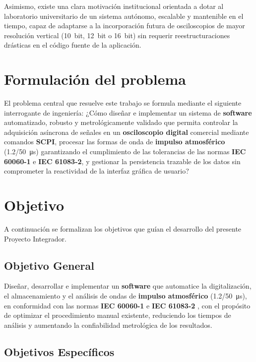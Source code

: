 Asimismo, existe una clara motivación institucional orientada a dotar al laboratorio universitario de un sistema autónomo, escalable y mantenible en el tiempo, capaz de adaptarse a la incorporación futura de osciloscopios de mayor resolución vertical (\qty{10}{bit}, \qty{12}{bit} o \qty{16}{bit}) sin requerir reestructuraciones drásticas en el código fuente de la aplicación.

\section{Formulación del problema} \label{sec:formulacion_problema}

El problema central que resuelve este trabajo se formula mediante el siguiente interrogante de ingeniería: ¿Cómo diseñar e implementar un sistema de \textbf{software} automatizado, robusto y metrológicamente validado que permita controlar la adquisición asíncrona de señales en un \textbf{osciloscopio digital} comercial mediante comandos \textbf{SCPI}, procesar las formas de onda de \textbf{impulso atmosférico} (\qty[parse-numbers=false]{1.2/50}{\micro\second}) garantizando el cumplimiento de las tolerancias de las normas \textbf{IEC 60060-1} e \textbf{IEC 61083-2}, y gestionar la persistencia trazable de los datos sin comprometer la reactividad de la interfaz gráfica de usuario?

\section{Objetivo} \label{sec:objetivos}

A continuación se formalizan los objetivos que guían el desarrollo del presente Proyecto Integrador.

\subsection{Objetivo General} \label{subsec:objetivo_general}

Diseñar, desarrollar e implementar un \textbf{software} que automatice la digitalización, el almacenamiento y el análisis de ondas de \textbf{impulso atmosférico} (\qty[parse-numbers=false]{1.2/50}{\micro\second}), en conformidad con las normas \textbf{IEC 60060-1} \cite{iec60060_1} e \textbf{IEC 61083-2} \cite{iec61083_2}, con el propósito de optimizar el procedimiento manual existente, reduciendo los tiempos de análisis y aumentando la confiabilidad metrológica de los resultados.

\subsection{Objetivos Específicos} \label{subsec:objetivos_especificos}

